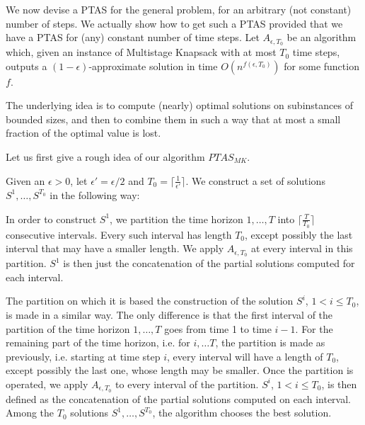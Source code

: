 \documentclass[a4paper]{book}
\begin{document}



We now devise a PTAS for the general problem, for an arbitrary (not constant) number
 of steps. We actually show how to get such a PTAS provided that we have a PTAS for (any)
constant number of time steps.
Let $A_{\epsilon,T_0}$ be an algorithm which, given an instance of {\sc Multistage Knapsack} with at
most $T_0$ time steps, outputs a $(1-\epsilon)$-approximate solution in time $O(n^{f(\epsilon,T_0)})$
 for some
function $f$.

 The underlying idea is to compute (nearly) optimal solutions on subinstances of bounded
 sizes, and then to combine them in such a way that at most a small fraction of the optimal
value is lost. 

 Let us first give a rough idea of our algorithm $PTAS_{MK}$.

Given an $\epsilon >0$, let $\epsilon'=\epsilon/2$ and $T_0 =\lceil \frac{1}{\epsilon'}\rceil$. We construct a set of solutions $S^1,\ldots ,S^{T_0}$ in the following way: 

In order to construct $S^1$, we partition the time horizon $1,\ldots, T$ into  $\lceil \frac{T}{T_0}\rceil$ consecutive intervals. Every such interval has length $T_0$, except possibly the last interval that may have a smaller length. We apply $A_{\epsilon,T_0}$ at every interval in this partition. $S^1$ is  then just the  concatenation of the partial solutions computed for each interval.

The partition on which it is based the construction of the solution $S^i$, $1<i \leq T_0$, is made in a similar way. The only difference is that the first interval of the partition of the time horizon $1,\ldots, T$ goes from time 1 to time $i-1$. For the remaining part of the time horizon, i.e. for $i, \ldots T$,  the partition is made as previously, i.e. starting at time step $i$, every interval will have a length of $T_0$, except possibly the last one, whose length may be smaller. Once the partition is operated,  we apply $A_{\epsilon,T_0}$ to every interval of the partition. $S^i$, $1<i \leq T_0$, is then defined as the concatenation of the partial solutions computed on each interval.
Among the $T_0$ solutions  $S^1,\ldots ,S^{T_0}$, the algorithm chooses the best solution.%
\end{document}

